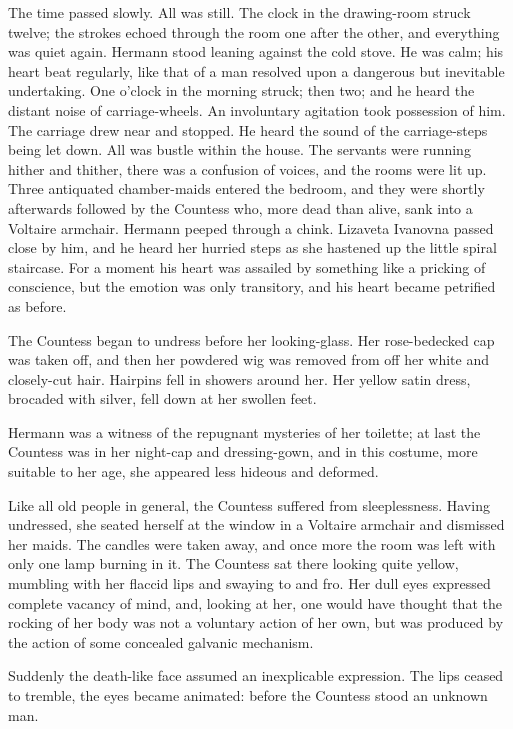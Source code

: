The time passed slowly. All was still. The clock in the drawing-room
struck twelve; the strokes echoed through the room one after the
other, and everything was quiet again. Hermann stood leaning against
the cold stove. He was calm; his heart beat regularly, like that of a
man resolved upon a dangerous but inevitable undertaking. One o'clock
in the morning struck; then two; and he heard the distant noise of
carriage-wheels. An involuntary agitation took possession of him. The
carriage drew near and stopped. He heard the sound of the
carriage-steps being let down. All was bustle within the house. The
servants were running hither and thither, there was a confusion of
voices, and the rooms were lit up. Three antiquated chamber-maids
entered the bedroom, and they were shortly afterwards followed by the
Countess who, more dead than alive, sank into a Voltaire armchair.
Hermann peeped through a chink. Lizaveta Ivanovna passed close by him,
and he heard her hurried steps as she hastened up the little spiral
staircase. For a moment his heart was assailed by something like a
pricking of conscience, but the emotion was only transitory, and his
heart became petrified as before.

The Countess began to undress before her looking-glass. Her
rose-bedecked cap was taken off, and then her powdered wig was removed
from off her white and closely-cut hair. Hairpins fell in showers
around her. Her yellow satin dress, brocaded with silver, fell down at
her swollen feet.

Hermann was a witness of the repugnant mysteries of her toilette; at
last the Countess was in her night-cap and dressing-gown, and in this
costume, more suitable to her age, she appeared less hideous and
deformed.

Like all old people in general, the Countess suffered from
sleeplessness. Having undressed, she seated herself at the window in a
Voltaire armchair and dismissed her maids. The candles were taken
away, and once more the room was left with only one lamp burning in
it. The Countess sat there looking quite yellow, mumbling with her
flaccid lips and swaying to and fro. Her dull eyes expressed complete
vacancy of mind, and, looking at her, one would have thought that the
rocking of her body was not a voluntary action of her own, but was
produced by the action of some concealed galvanic mechanism.

Suddenly the death-like face assumed an inexplicable expression. The
lips ceased to tremble, the eyes became animated: before the Countess
stood an unknown man.

